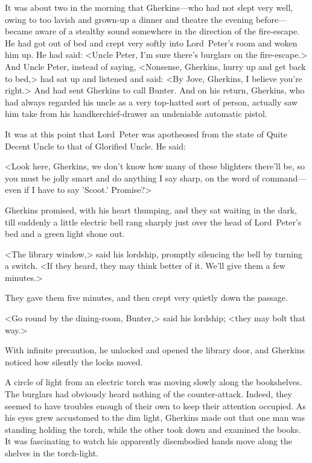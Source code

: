 It was about two in the morning that Gherkins—who had not slept very well, owing to too lavish and grown-up a dinner and theatre the evening before—became aware of a stealthy sound somewhere in the direction of the fire-escape. He had got out of bed and crept very softly into Lord~Peter's room and woken him up. He had said: <Uncle Peter, I'm sure there's burglars on the fire-escape.> And Uncle Peter, instead of saying, <Nonsense, Gherkins, hurry up and get back to bed,> had sat up and listened and said: <By Jove, Gherkins, I believe you're right.> And had sent Gherkins to call Bunter. And on his return, Gherkins, who had always regarded his uncle as a very top-hatted sort of person, actually saw him take from his handkerchief-drawer an undeniable automatic pistol.

It was at this point that Lord~Peter was apotheosed from the state of Quite Decent Uncle to that of Glorified Uncle. He said:

<Look here, Gherkins, we don't know how many of these blighters there'll be, so you must be jolly smart and do anything I say sharp, on the word of command—even if I have to say 'Scoot.' Promise?>

Gherkins promised, with his heart thumping, and they sat waiting in the dark, till suddenly a little electric bell rang sharply just over the head of Lord~Peter's bed and a green light shone out.

<The library window,> said his lordship, promptly silencing the bell by turning a switch. <If they heard, they may think better of it. We'll give them a few minutes.>

They gave them five minutes, and then crept very quietly down the passage.

<Go round by the dining-room, Bunter,> said his lordship; <they may bolt that way.>

With infinite precaution, he unlocked and opened the library door, and Gherkins noticed how silently the locks moved.

A circle of light from an electric torch was moving slowly along the bookshelves. The burglars had obviously heard nothing of the counter-attack. Indeed, they seemed to have troubles enough of their own to keep their attention occupied. As his eyes grew accustomed to the dim light, Gherkins made out that one man was standing holding the torch, while the other took down and examined the books. It was fascinating to watch his apparently disembodied hands move along the shelves in the torch-light.

